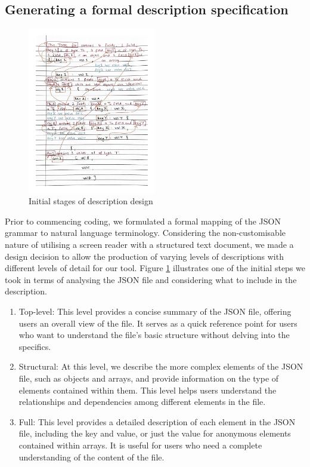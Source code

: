 \documentclass{l4proj}
\begin{document}
\subsection{Generating a formal description specification}

\begin{figure}
    \caption{Initial stages of description design}
    \label{fig:descDesign}
    \includegraphics[width=0.5\textwidth]{dissertation/images/Description planning.jpg}
\end{figure}

Prior to commencing coding, we formulated a formal mapping of the JSON grammar to natural language terminology. Considering the non-customisable nature of utilising a screen reader with a structured text document, we made a design decision to allow the production of varying levels of descriptions with different levels of detail for our tool. Figure \ref{fig:descDesign} illustrates one of the initial steps we took in terms of analysing the JSON file and considering what to include in the description.

\begin{enumerate}
    \item Top-level: This level provides a concise summary of the JSON file, offering users an overall view of the file. It serves as a quick reference point for users who want to understand the file's basic structure without delving into the specifics.
    \item Structural: At this level, we describe the more complex elements of the JSON file, such as objects and arrays, and provide information on the type of elements contained within them. This level helps users understand the relationships and dependencies among different elements in the file.
    \item Full: This level provides a detailed description of each element in the JSON file, including the key and value, or just the value for anonymous elements contained within arrays. It is useful for users who need a complete understanding of the content of the file.
\end{enumerate}
	
\end{document}
